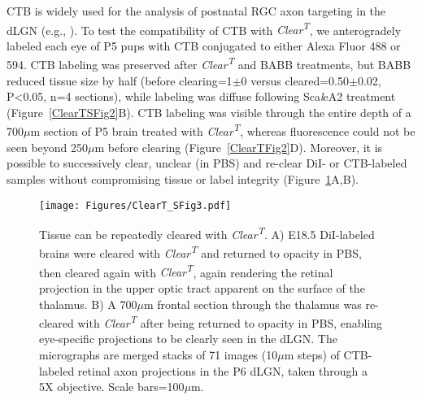 CTB is widely used for the analysis of postnatal RGC axon targeting in the dLGN (e.g., ).
To test the compatibility of CTB with \emph{Clear\textsuperscript{T}}, we anterogradely labeled each eye of P5 pups with CTB conjugated to either Alexa Fluor 488 or 594.
CTB labeling was preserved after \emph{Clear\textsuperscript{T}} and BABB treatments, but BABB reduced tissue size by half (before clearing=1$\pm$0 versus cleared=0.50$\pm$0.02, P<0.05, n=4 sections), while labeling was diffuse following Sca\emph{l}eA2 treatment (Figure~\ref{ClearTSFig2}B).
CTB labeling was visible through the entire depth of a 700$\mu$m section of P5 brain treated with \emph{Clear\textsuperscript{T}}, whereas fluorescence could not be seen beyond 250$\mu$m before clearing (Figure~\ref{ClearTFig2}D).
Moreover, it is possible to successively clear, unclear (in PBS) and re-clear DiI- or CTB-labeled samples without compromising tissue or label integrity (Figure~\ref{ClearTSFig3}A,B).
\begin{figure}[hbtp]
    \begin{center}
        \texttt{[image: Figures/ClearT\_SFig3.pdf]}
        \caption[Tissue can be repeatedly cleared with \emph{Clear\textsuperscript{T}}.]
        {Tissue can be repeatedly cleared with \emph{Clear\textsuperscript{T}}.
        A) E18.5 DiI-labeled brains were cleared with \emph{Clear\textsuperscript{T}} and returned to opacity in PBS, then cleared again with \emph{Clear\textsuperscript{T}}, again rendering the retinal projection in the upper optic tract apparent on the surface of the thalamus.
        B) A 700$\mu$m frontal section through the thalamus was re-cleared with \emph{Clear\textsuperscript{T}} after being returned to opacity in PBS, enabling eye-specific projections to be clearly seen in the dLGN.
        The micrographs are merged stacks of 71 images (10$\mu$m steps) of CTB-labeled retinal axon projections in the P6 dLGN, taken through a 5X objective.
        Scale bars=100$\mu$m.
        }
        \label{ClearTSFig3}
    \end{center}
\end{figure}